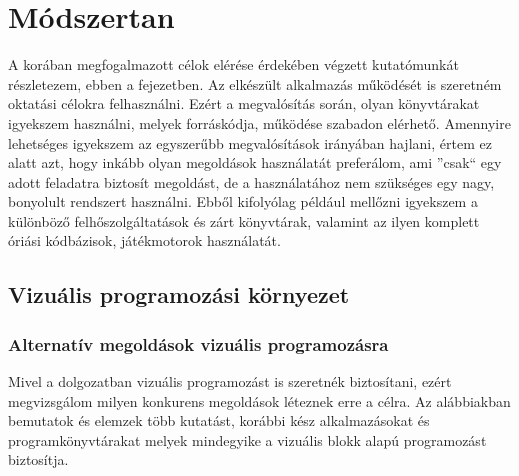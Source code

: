 \documentclass[12pt,a4paper,oneside]{report} %
\begin{document}

\chapter{Módszertan}
\label{modtan}
A korában megfogalmazott célok elérése érdekében végzett kutatómunkát részletezem, ebben a fejezetben.
Az elkészült alkalmazás működését is szeretném oktatási célokra felhasználni. Ezért a megvalósítás során, olyan könyvtárakat igyekszem használni,  melyek forráskódja, működése szabadon elérhető. Amennyire lehetséges igyekszem az egyszerűbb megvalósítások irányában hajlani, értem ez alatt azt, hogy inkább olyan megoldások használatát preferálom, ami ''csak`` egy adott feladatra biztosít megoldást, de a használatához nem szükséges egy nagy, bonyolult rendszert használni. Ebből  kifolyólag például mellőzni igyekszem a különböző felhőszolgáltatások és zárt könyvtárak, valamint az ilyen komplett óriási kódbázisok, játékmotorok használatát.
\section{Vizuális programozási környezet}
\subsection{Alternatív megoldások vizuális programozásra}
\label{vizuprogkor}
Mivel a dolgozatban vizuális  programozást  is szeretnék biztosítani, ezért megvizsgálom milyen konkurens megoldások léteznek erre a célra. Az alábbiakban bemutatok és elemzek több kutatást, korábbi kész alkalmazásokat és programkönyvtárakat melyek mindegyike a vizuális blokk alapú programozást biztosítja.
\end{document}
